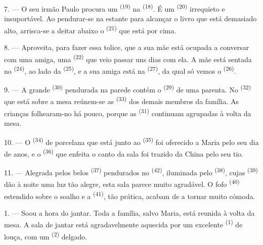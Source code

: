 7. --- O seu irmão Paulo procura um  \textsuperscript{(19)} na
 \textsuperscript{(18)}. É um  \textsuperscript{(20)}
irrequieto e insuportável. Ao pendurar-se na estante para alcançar o
livro que está demasiado alto, arrisca-se a deitar abaixo o 
\textsuperscript{(21)} que está por cima.

8. --- Aproveita, para fazer essa tolice, que a sua mãe está ocupada a
conversar com uma amiga, uma  \textsuperscript{(22)} que veio
passar uns dias com ela. A mãe está sentada no 
\textsuperscript{(24)}, ao lado da  \textsuperscript{(25)}, e a sua
amiga está na  \textsuperscript{(27)}, da qual só vemos o
 \textsuperscript{(26)}.

9. --- A grande  \textsuperscript{(30)} pendurada na parede contém
o  \textsuperscript{(29)} de uma parenta. No 
\textsuperscript{(32)} que está sobre a mesa reúnem-se as 
\textsuperscript{(33)} dos demais membros da família. As crianças folhearam-no
há pouco, porque as  \textsuperscript{(31)} continuam agrupadas à
volta da mesa.

10. --- O  \textsuperscript{(34)} de porcelana que está
junto ao  \textsuperscript{(35)} foi oferecido a Maria pelo
seu dia de anos, e o  \textsuperscript{(36)} que enfeita o canto da
sala foi trazido da China pelo seu tio.

11. --- Alegrada pelos belos  \textsuperscript{(37)} pendurados no
 \textsuperscript{(42)}, iluminada pelo 
\textsuperscript{(38)}, cujas  \textsuperscript{(39)} dão à noite uma
luz tão alegre, esta sala parece muito agradável. O fofo 
\textsuperscript{(40)} estendido sobre o soalho e a 
\textsuperscript{(41)}, tão prática, acabam de a tornar muito cómoda.

\VUsaut{3.6mm}
\VUsaut{3.0mm}

1. --- Soou a hora do jantar. Toda a família, salvo Maria, está reunida à
volta da mesa. A sala de jantar está agradavelmente aquecida por um
excelente  \textsuperscript{(1)} de louça, com um 
\textsuperscript{(2)} delgado.

